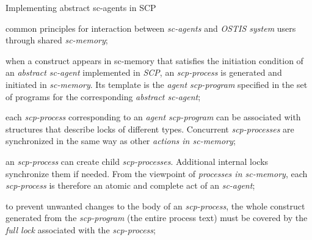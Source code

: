 \begin{frame}{Implementing abstract sc-agents in SCP}
\topline
\topline
\justifying
\vspace{10mm}

    \begin{textitemize}
    \item common principles for interaction between \textit{sc-agents} and \textit{OSTIS system} users through shared \textit{sc-memory};
\item when a construct appears in sc-memory that satisfies the initiation condition of an \textit{abstract sc-agent} implemented in \textit{SCP}, an \textit{scp-process} is generated and initiated in \textit{sc-memory}. Its template is the \textit{agent scp-program} specified in the set of programs for the corresponding \textit{abstract sc-agent};
\item each \textit{scp-process} corresponding to an \textit{agent scp-program} can be associated with structures that describe locks of different types. Concurrent \textit{scp-processes} are synchronized in the same way as other \textit{actions in sc-memory};
\end{textitemize}
\end{frame}

\begin{frame}{}
\topline
\justifying
	\setlength{\emergencystretch}{2em}
\vspace{10mm}


\begin{textitemize}
    \item an \textit{scp-process} can create child \textit{scp-processes}. Additional internal locks synchronize them if needed. From the viewpoint of \textit{processes in sc-memory}, each \textit{scp-process} is therefore an atomic and complete act of an \textit{sc-agent};
    \item to prevent unwanted changes to the body of an \textit{scp-process}, the whole construct generated from the \textit{scp-program} (the entire process text) must be covered by the \textit{full lock} associated with the \textit{scp-process};
\end{textitemize}
\end{frame}

